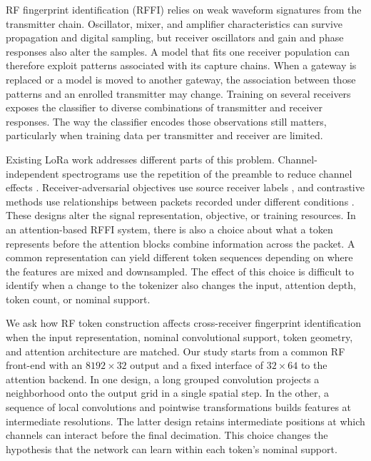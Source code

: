 \documentclass[journal]{IEEEtran}
\begin{document}
RF fingerprint identification (RFFI) relies on weak waveform signatures from the transmitter chain. Oscillator, mixer, and amplifier characteristics can survive propagation and digital sampling, but receiver oscillators and gain and phase responses also alter the samples. A model that fits one receiver population can therefore exploit patterns associated with its capture chains. When a gateway is replaced or a model is moved to another gateway, the association between those patterns and an enrolled transmitter may change. Training on several receivers exposes the classifier to diverse combinations of transmitter and receiver responses. The way the classifier encodes those observations still matters, particularly when training data per transmitter and receiver are limited.

Existing LoRa work addresses different parts of this problem. Channel-independent spectrograms use the repetition of the preamble to reduce channel effects \cite{shen2022scalable}. Receiver-adversarial objectives use source receiver labels \cite{shen2024receiver}, and contrastive methods use relationships between packets recorded under different conditions \cite{ma2025robust}. These designs alter the signal representation, objective, or training resources. In an attention-based RFFI system, there is also a choice about what a token represents before the attention blocks combine information across the packet. A common representation can yield different token sequences depending on where the features are mixed and downsampled. The effect of this choice is difficult to identify when a change to the tokenizer also changes the input, attention depth, token count, or nominal support.

We ask how RF token construction affects cross-receiver fingerprint identification when the input representation, nominal convolutional support, token geometry, and attention architecture are matched. Our study starts from a common RF front-end with an \(8192\times32\) output and a fixed interface of \(32\times64\) to the attention backend. In one design, a long grouped convolution projects a neighborhood onto the output grid in a single spatial step. In the other, a sequence of local convolutions and pointwise transformations builds features at intermediate resolutions. The latter design retains intermediate positions at which channels can interact before the final decimation. This choice changes the hypothesis that the network can learn within each token's nominal support.
\end{document}
